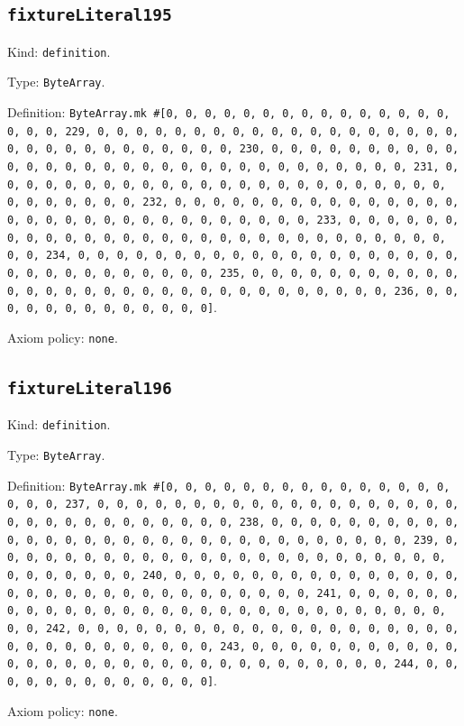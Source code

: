 \documentclass[11pt]{article}
\begin{document}
\subsection*{\texttt{fixtureLiteral195}}
\noindent Kind: \texttt{definition}.\par
\noindent Type: \texttt{ByteArray}.\par
\noindent Definition: \texttt{ByteArray.mk \#[0, 0, 0, 0, 0, 0, 0, 0, 0, 0, 0, 0, 0, 0, 0, 0, 0, 0, 229, 0, 0, 0, 0, 0, 0, 0, 0, 0, 0, 0, 0, 0, 0, 0, 0, 0, 0, 0, 0, 0, 0, 0, 0, 0, 0, 0, 0, 0, 0, 0, 230, 0, 0, 0, 0, 0, 0, 0, 0, 0, 0, 0, 0, 0, 0, 0, 0, 0, 0, 0, 0, 0, 0, 0, 0, 0, 0, 0, 0, 0, 0, 0, 231, 0, 0, 0, 0, 0, 0, 0, 0, 0, 0, 0, 0, 0, 0, 0, 0, 0, 0, 0, 0, 0, 0, 0, 0, 0, 0, 0, 0, 0, 0, 0, 232, 0, 0, 0, 0, 0, 0, 0, 0, 0, 0, 0, 0, 0, 0, 0, 0, 0, 0, 0, 0, 0, 0, 0, 0, 0, 0, 0, 0, 0, 0, 0, 233, 0, 0, 0, 0, 0, 0, 0, 0, 0, 0, 0, 0, 0, 0, 0, 0, 0, 0, 0, 0, 0, 0, 0, 0, 0, 0, 0, 0, 0, 0, 0, 234, 0, 0, 0, 0, 0, 0, 0, 0, 0, 0, 0, 0, 0, 0, 0, 0, 0, 0, 0, 0, 0, 0, 0, 0, 0, 0, 0, 0, 0, 0, 0, 235, 0, 0, 0, 0, 0, 0, 0, 0, 0, 0, 0, 0, 0, 0, 0, 0, 0, 0, 0, 0, 0, 0, 0, 0, 0, 0, 0, 0, 0, 0, 0, 236, 0, 0, 0, 0, 0, 0, 0, 0, 0, 0, 0, 0, 0]}.\par
\noindent Axiom policy: \texttt{none}.\par
\subsection*{\texttt{fixtureLiteral196}}
\noindent Kind: \texttt{definition}.\par
\noindent Type: \texttt{ByteArray}.\par
\noindent Definition: \texttt{ByteArray.mk \#[0, 0, 0, 0, 0, 0, 0, 0, 0, 0, 0, 0, 0, 0, 0, 0, 0, 0, 237, 0, 0, 0, 0, 0, 0, 0, 0, 0, 0, 0, 0, 0, 0, 0, 0, 0, 0, 0, 0, 0, 0, 0, 0, 0, 0, 0, 0, 0, 0, 0, 238, 0, 0, 0, 0, 0, 0, 0, 0, 0, 0, 0, 0, 0, 0, 0, 0, 0, 0, 0, 0, 0, 0, 0, 0, 0, 0, 0, 0, 0, 0, 0, 239, 0, 0, 0, 0, 0, 0, 0, 0, 0, 0, 0, 0, 0, 0, 0, 0, 0, 0, 0, 0, 0, 0, 0, 0, 0, 0, 0, 0, 0, 0, 0, 240, 0, 0, 0, 0, 0, 0, 0, 0, 0, 0, 0, 0, 0, 0, 0, 0, 0, 0, 0, 0, 0, 0, 0, 0, 0, 0, 0, 0, 0, 0, 0, 241, 0, 0, 0, 0, 0, 0, 0, 0, 0, 0, 0, 0, 0, 0, 0, 0, 0, 0, 0, 0, 0, 0, 0, 0, 0, 0, 0, 0, 0, 0, 0, 242, 0, 0, 0, 0, 0, 0, 0, 0, 0, 0, 0, 0, 0, 0, 0, 0, 0, 0, 0, 0, 0, 0, 0, 0, 0, 0, 0, 0, 0, 0, 0, 243, 0, 0, 0, 0, 0, 0, 0, 0, 0, 0, 0, 0, 0, 0, 0, 0, 0, 0, 0, 0, 0, 0, 0, 0, 0, 0, 0, 0, 0, 0, 0, 244, 0, 0, 0, 0, 0, 0, 0, 0, 0, 0, 0, 0, 0]}.\par
\noindent Axiom policy: \texttt{none}.\par
\end{document}
